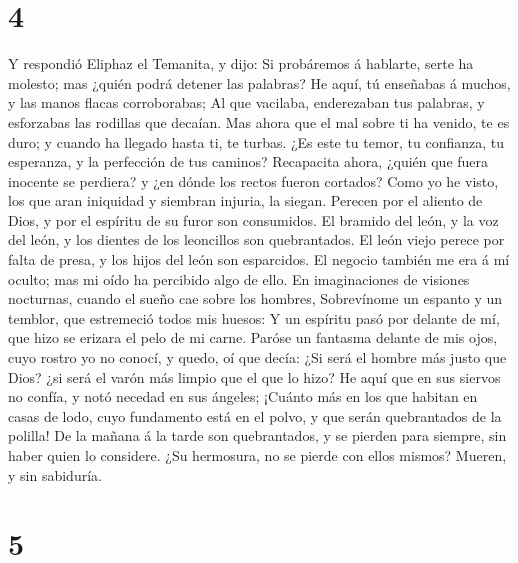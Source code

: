 \hypertarget{section-3}{%
\section{4}\label{section-3}}

 Y respondió Eliphaz el Temanita, y dijo: 
Si probáremos á hablarte, serte ha molesto; mas ¿quién podrá detener las
palabras?  He aquí, tú enseñabas á muchos, y las manos
flacas corroborabas;  Al que vacilaba, enderezaban tus
palabras, y esforzabas las rodillas que decaían.  Mas
ahora que el mal sobre ti ha venido, te es duro; y cuando ha llegado
hasta ti, te turbas.  ¿Es este tu temor, tu confianza, tu
esperanza, y la perfección de tus caminos?  Recapacita
ahora, ¿quién que fuera inocente se perdiera? y ¿en dónde los rectos
fueron cortados?  Como yo he visto, los que aran iniquidad
y siembran injuria, la siegan.  Perecen por el aliento de
Dios, y por el espíritu de su furor son consumidos.  El
bramido del león, y la voz del león, y los dientes de los leoncillos son
quebrantados.  El león viejo perece por falta de presa, y
los hijos del león son esparcidos.  El negocio también me
era á mí oculto; mas mi oído ha percibido algo de ello. 
En imaginaciones de visiones nocturnas, cuando el sueño cae sobre los
hombres,  Sobrevínome un espanto y un temblor, que
estremeció todos mis huesos:  Y un espíritu pasó por
delante de mí, que hizo se erizara el pelo de mi carne. 
Paróse un fantasma delante de mis ojos, cuyo rostro yo no conocí, y
quedo, oí que decía:  ¿Si será el hombre más justo que
Dios? ¿si será el varón más limpio que el que lo hizo? 
He aquí que en sus siervos no confía, y notó necedad en sus ángeles;
 ¡Cuánto más en los que habitan en casas de lodo, cuyo
fundamento está en el polvo, y que serán quebrantados de la polilla!
 De la mañana á la tarde son quebrantados, y se pierden
para siempre, sin haber quien lo considere.  ¿Su
hermosura, no se pierde con ellos mismos? Mueren, y sin sabiduría.

\hypertarget{section-4}{%
\section{5}\label{section-4}}

